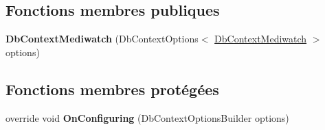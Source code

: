 \subsection*{Fonctions membres publiques}
\begin{DoxyCompactItemize}
\item 
\mbox{\label{class_server_1_1_db_context_mediwatch_a94fde86883fe0a2d1ce0b4c58f06727f}} 
{\bfseries Db\+Context\+Mediwatch} (Db\+Context\+Options$<$ \hyperlink{class_server_1_1_db_context_mediwatch}{Db\+Context\+Mediwatch} $>$ options)
\end{DoxyCompactItemize}
\subsection*{Fonctions membres protégées}
\begin{DoxyCompactItemize}
\item 
\mbox{\label{class_server_1_1_db_context_mediwatch_a72073ff88f3990c4792f85688f55f073}} 
override void {\bfseries On\+Configuring} (Db\+Context\+Options\+Builder options)
\end{DoxyCompactItemize}
